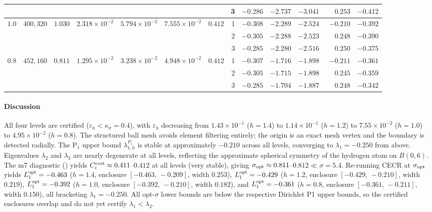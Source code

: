 \documentclass[11pt]{article}
\theoremstyle{plain}
\theoremstyle{definition}
\theoremstyle{remark}
\begin{document}
\begin{table}[htbp]
{\begin{tabular}{ccrrccc|rrrrrr}
& & & & & & & 3 & $-0.286$ & $-2.737$ & $-3.041$ & $\phantom{-}0.253$ & $-0.412$ \\
\midrule
\multirow{3}{*}{$1.0$}
  & \multirow{3}{*}{$400{,}320$}
  & \multirow{3}{*}{$1.030$}
  & \multirow{3}{*}{$2.318{\times}10^{-2}$}
  & \multirow{3}{*}{$5.794{\times}10^{-2}$}
  & \multirow{3}{*}{$7.555{\times}10^{-2}$}
  & \multirow{3}{*}{$0.412$}
  & 1 & $-0.308$ & $-2.289$ & $-2.524$ & $-0.210$ & $-0.392$ \\
& & & & & & & 2 & $-0.305$ & $-2.288$ & $-2.523$ & $\phantom{-}0.248$ & $-0.390$ \\
& & & & & & & 3 & $-0.285$ & $-2.280$ & $-2.516$ & $\phantom{-}0.250$ & $-0.375$ \\
\midrule
\multirow{3}{*}{$0.8$}
  & \multirow{3}{*}{$452{,}160$}
  & \multirow{3}{*}{$0.811$}
  & \multirow{3}{*}{$1.295{\times}10^{-2}$}
  & \multirow{3}{*}{$3.238{\times}10^{-2}$}
  & \multirow{3}{*}{$4.948{\times}10^{-2}$}
  & \multirow{3}{*}{$0.412$}
  & 1 & $-0.307$ & $-1.716$ & $-1.898$ & $-0.211$ & $-0.361$ \\
& & & & & & & 2 & $-0.305$ & $-1.715$ & $-1.898$ & $\phantom{-}0.245$ & $-0.359$ \\
& & & & & & & 3 & $-0.285$ & $-1.704$ & $-1.887$ & $\phantom{-}0.248$ & $-0.342$ \\
\bottomrule
\end{tabular}}
\end{table}

\paragraph{Discussion}
All four levels are certified ($\varepsilon_h<\kappa_\sigma=0.4$), with $\varepsilon_h$
decreasing from $1.43{\times}10^{-1}$ ($h=1.4$) to $1.14{\times}10^{-1}$ ($h=1.2$)
to $7.55{\times}10^{-2}$ ($h=1.0$) to $4.95{\times}10^{-2}$ ($h=0.8$).
The structured ball mesh avoids element filtering entirely;
the origin is an exact mesh vertex and the boundary is detected radially.
The $\mathrm{P}_1$ upper bound $\lambda_{1,h}^{P_1}$ is stable at approximately $-0.210$
across all levels, converging to $\lambda_1=-0.250$ from above.
Eigenvalues $\lambda_2$ and $\lambda_3$ are nearly degenerate at all levels,
reflecting the approximate spherical symmetry of the hydrogen atom on $B(0,6)$.
The m7 diagnostic () yields $C_\epsilon^{\rm cert}\approx 0.411$--$0.412$
at all levels (very stable), giving $\sigma_{\rm opt}\approx 0.811$--$0.812\ll\sigma=5.4$.
Re-running CECR at $\sigma_{\rm opt}$ yields
$L_1^{\rm opt}=-0.463$ ($h=1.4$, enclosure $[-0.463,\,-0.209]$, width $0.253$),
$L_1^{\rm opt}=-0.429$ ($h=1.2$, enclosure $[-0.429,\,-0.210]$, width $0.219$),
$L_1^{\rm opt}=-0.392$ ($h=1.0$, enclosure $[-0.392,\,-0.210]$, width $0.182$),
and $L_1^{\rm opt}=-0.361$ ($h=0.8$, enclosure $[-0.361,\,-0.211]$, width $0.150$),
all bracketing $\lambda_1=-0.250$.
All opt-$\sigma$ lower bounds are below the respective Dirichlet P1 upper bounds,
so the certified enclosures overlap and do not yet certify $\lambda_1<\lambda_2$.
\end{document}
